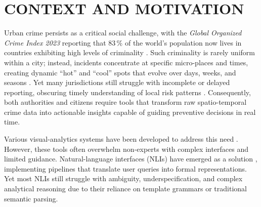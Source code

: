 \chapter{CONTEXT AND MOTIVATION} 



Urban crime persists as a critical social challenge, with the \emph{Global Organized Crime Index 2023} reporting that 83\,\% of the world’s population now lives in countries exhibiting high levels of criminality \citep{GlobalCrimeIndex2023}.
Such criminality is rarely uniform within a city; instead, incidents concentrate at specific micro-places and times, creating dynamic “hot” and “cool” spots that evolve over days, weeks, and seasons \citep{Garcia2022CriPAV}.
Yet many jurisdictions still struggle with incomplete or delayed reporting, obscuring timely understanding of local risk patterns \citep{NSSFCrimeReporting2023}. Consequently, both authorities and citizens require tools that transform raw spatio-temporal crime data into actionable insights capable of guiding preventive decisions in real time.


Various visual-analytics systems have been developed to address this need \citep{Garcia2022CriPAV, Salah2022BigCDVis, Silva2017CrimeVisAI, Garcia2020MiranteAV, Garcia2021CrimAnalyzer}. However, these tools often overwhelm non-experts with complex interfaces and limited guidance. Natural-language interfaces (NLIs) have emerged as a solution \citep{Setlur2016Eviza, Narechania2021NL4DV, Luo2022NL2Vis, Liu2021ADVISor, Sah2024GeneratingAnalyticsDataVizLLMs}, implementing pipelines that translate user queries into formal representations. Yet most NLIs still struggle with ambiguity, underspecification, and complex analytical reasoning due to their reliance on template grammars or traditional semantic parsing.
 

